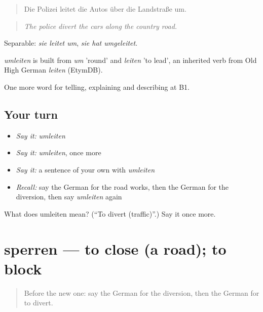 \begin{quote}
Die Polizei leitet die Autos über die Landstraße um.
\end{quote}

\begin{quote}
\emph{The police divert the cars along the country road.}
\end{quote}

Separable: \emph{sie leitet um}, \emph{sie hat umgeleitet}.

\begin{cousinweb}
\emph{umleiten} is built from \emph{um} 'round' and \emph{leiten} 'to lead', an inherited verb from Old High German \emph{leiten} (EtymDB).
\end{cousinweb}

\begin{grammarlens}[title={What you've built}]
One more word for telling, explaining and describing at B1.
\end{grammarlens}

\subsection*{Your turn}
\begin{itemize}
\raggedright
  \item \emph{Say it:} \emph{umleiten}
  \item \emph{Say it:} \emph{umleiten}, once more
  \item \emph{Say it:} a sentence of your own with \emph{umleiten}
  \item \emph{Recall:} say the German for the road works, then the German for the diversion, then say \emph{umleiten} again
\end{itemize}

\begin{tcolorbox}[breakable,colback=teal!4,colframe=teal!35!black,title={Before you move on}]
What does umleiten mean? (\textquotedblleft{}To divert (traffic)\textquotedblright{}.) Say it once more.
\end{tcolorbox}
\section[sperren]{sperren — to close (a road); to block}

\label{lesson:GE-C409-sperren}



\begin{quote}
Before the new one: say the German for the diversion, then the German for to divert.
\end{quote}

